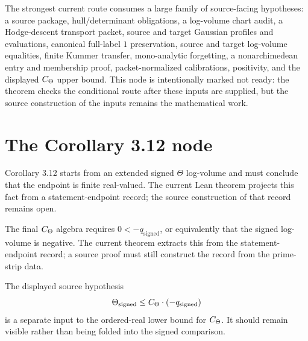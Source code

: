 \begin{definition}
  \label{def:packet-calibrated-hypothesis-ledger}
  \notready
  The strongest current route consumes a large family of source-facing
  hypotheses: a source package, hull/determinant obligations, a log-volume
  chart audit, a Hodge-descent transport packet, source and target Gaussian
  profiles and evaluations, canonical full-label \(1\) preservation, source
  and target log-volume equalities, finite Kummer transfer, mono-analytic
  forgetting, a nonarchimedean entry and membership proof, packet-normalized
  calibrations, \qPilot{} positivity, and the displayed \(C_\Theta\) upper
  bound.  This node is intentionally marked not ready: the theorem checks
  the conditional route after these inputs are supplied, but the source
  construction of the inputs remains the mathematical work.
\end{definition}

\section{The Corollary 3.12 node}

\begin{definition}
  \label{def:theta-finite-real-endpoint}
  \notready
  Corollary 3.12 starts from an extended signed \(\Theta\) log-volume and must
  conclude that the endpoint is finite real-valued.  The current Lean theorem
  projects this fact from a statement-endpoint record; the source construction
  of that record remains open.
\end{definition}

\begin{definition}
  \label{def:q-pilot-positivity}
  \notready
  The final \(C_\Theta\) algebra requires \(0<-q_{\mathrm{signed}}\), or
  equivalently that the signed \qPilot{} log-volume is negative.  The current
  theorem extracts this from the statement-endpoint record; a source proof
  must still construct the record from the prime-strip data.
\end{definition}

\begin{definition}
  \label{def:displayed-ctheta-upper-bound}
  \notready
  The displayed source hypothesis
  \[
    \Theta_{\mathrm{signed}}
      \le C_\Theta\cdot(-q_{\mathrm{signed}})
  \]
  is a separate input to the ordered-real lower bound for \(C_\Theta\).  It
  should remain visible rather than being folded into the signed comparison.
\end{definition}

